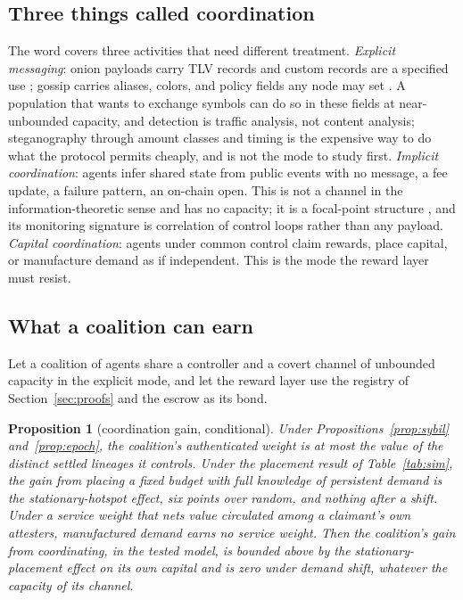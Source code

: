 \documentclass[11pt]{article}
\theoremstyle{plain}
\newtheorem{proposition}{Proposition}
\theoremstyle{definition}
\theoremstyle{remark}
\begin{document}
\subsection{Three things called coordination}

The word covers three activities that need different treatment. \emph{Explicit messaging}: onion payloads carry TLV records and custom records are a specified use \citep{bolt4}; gossip carries aliases, colors, and policy fields any node may set \citep{bolt7}. A population that wants to exchange symbols can do so in these fields at near-unbounded capacity, and detection is traffic analysis, not content analysis; steganography through amount classes and timing is the expensive way to do what the protocol permits cheaply, and is not the mode to study first. \emph{Implicit coordination}: agents infer shared state from public events with no message, a fee update, a failure pattern, an on-chain open. This is not a channel in the information-theoretic sense and has no capacity; it is a focal-point structure \citep{schelling1960strategy}, and its monitoring signature is correlation of control loops rather than any payload. \emph{Capital coordination}: agents under common control claim rewards, place capital, or manufacture demand as if independent. This is the mode the reward layer must resist.

\subsection{What a coalition can earn}

Let a coalition of agents share a controller and a covert channel of unbounded capacity in the explicit mode, and let the reward layer use the registry of Section~\ref{sec:proofs} and the escrow as its bond.

\begin{proposition}[coordination gain, conditional]
\label{prop:coalition}
Under Propositions~\ref{prop:sybil} and~\ref{prop:epoch}, the coalition's authenticated weight is at most the value of the distinct settled lineages it controls. Under the placement result of Table~\ref{tab:sim}, the gain from placing a fixed budget with full knowledge of persistent demand is the stationary-hotspot effect, six points over random, and nothing after a shift. Under a service weight that nets value circulated among a claimant's own attesters, manufactured demand earns no service weight. Then the coalition's gain from coordinating, in the tested model, is bounded above by the stationary-placement effect on its own capital and is zero under demand shift, whatever the capacity of its channel.
\end{proposition}
\end{document}
